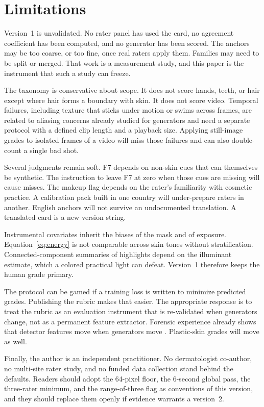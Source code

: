 \documentclass[10pt,twocolumn]{article}
\begin{document}
\section{Limitations}
\label{sec:limits}

Version~1 is unvalidated. No rater panel has used the card, no agreement coefficient has been computed, and no generator has been scored. The anchors may be too coarse, or too fine, once real raters apply them. Families may need to be split or merged. That work is a measurement study, and this paper is the instrument that such a study can freeze.

The taxonomy is conservative about scope. It does not score hands, teeth, or hair except where hair forms a boundary with skin. It does not score video. Temporal failures, including texture that sticks under motion or swims across frames, are related to aliasing concerns already studied for generators \cite{karras2021stylegan3} and need a separate protocol with a defined clip length and a playback size. Applying still-image grades to isolated frames of a video will miss those failures and can also double-count a single bad shot.

Several judgments remain soft. F7 depends on non-skin cues that can themselves be synthetic. The instruction to leave F7 at zero when those cues are missing will cause misses. The makeup flag depends on the rater's familiarity with cosmetic practice. A calibration pack built in one country will under-prepare raters in another. English anchors will not survive an undocumented translation. A translated card is a new version string.

Instrumental covariates inherit the biases of the mask and of exposure. Equation~\eqref{eq:energy} is not comparable across skin tones without stratification. Connected-component summaries of highlights depend on the illuminant estimate, which a colored practical light can defeat. Version~1 therefore keeps the human grade primary.

The protocol can be gamed if a training loss is written to minimize predicted grades. Publishing the rubric makes that easier. The appropriate response is to treat the rubric as an evaluation instrument that is re-validated when generators change, not as a permanent feature extractor. Forensic experience already shows that detector features move when generators move \cite{wang2020cnn,corvi2023icassp}. Plastic-skin grades will move as well.

Finally, the author is an independent practitioner. No dermatologist co-author, no multi-site rater study, and no funded data collection stand behind the defaults. Readers should adopt the 64-pixel floor, the 6-second global pass, the three-rater minimum, and the range-of-three flag as conventions of this version, and they should replace them openly if evidence warrants a version~2.
\end{document}
